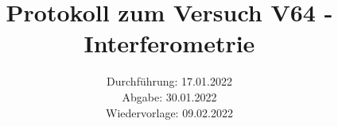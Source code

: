 \titlehead{\texttt{[image: resources/logo.jpg]}}
\title{Protokoll zum Versuch V64 - Interferometrie \\ }
\date{Durchführung: 17.01.2022 \\ Abgabe: 30.01.2022 \\ Wiedervorlage: 09.02.2022  }

